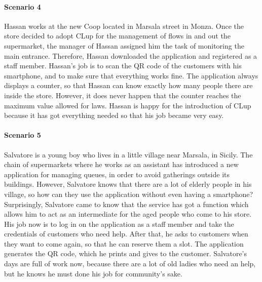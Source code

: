 \documentclass[table, 12pt]{article}
\begin{document}
\paragraph{Scenario 4}

Hassan works at the new Coop located in Marsala street in Monza. Once the store decided to adopt CLup for the management of flows in and out the supermarket, the manager of Hassan assigned him the task of monitoring the main entrance. Therefore, Hassan downloaded the application and registered as a staff member. Hassan's job is to scan the QR code of the customers with his smartphone, and to make sure that everything works fine. The application always displays a counter, so that Hassan can know exactly how many people there are inside the store. However, it does never happen that the counter reaches the maximum value allowed for laws. Hassan is happy for the introduction of CLup because it has got everything needed so that his job became very easy.

\paragraph{Scenario 5}

Salvatore is a young boy who lives in a little village near Marsala, in Sicily. The chain of supermarkets where he works as an assistant has introduced a new application for managing queues, in order to avoid gatherings outside its buildings. However, Salvatore knows that there are a lot of elderly people in his village, so how can they use the application without even having a smartphone? Surprisingly, Salvatore came to know that the service has got a function which allows him to act as an intermediate for the aged people who come to his store. His job now is to log in on the application as a staff member and take the credentials of customers who need help. After that, he asks to customers when they want to come again, so that he can reserve them a slot. The application generates the QR code, which he prints and gives to the customer. Salvatore's days are full of work now, because there are a lot of old ladies who need an help, but he knows he must done his job for community's sake.
\end{document}
